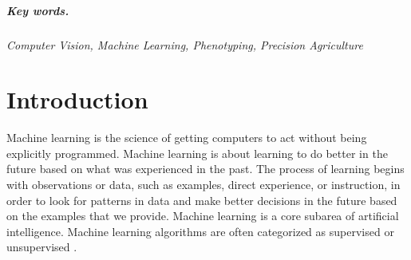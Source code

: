 \documentclass[12pt]{article}
\numberwithin{equation}{section}
\numberwithin{table}{section}
\numberwithin{figure}{section}
\begin{document}
\subparagraph{\textit{Key words.}}\textit{Computer Vision, Machine Learning, Phenotyping, Precision Agriculture}


\section{Introduction}

Machine learning is the science of getting computers to act without being explicitly programmed\cite{5392560}. Machine learning is about learning to do better in the future based on what was experienced in the past. The process of learning begins with observations or data, such as examples, direct experience, or instruction, in order to look for patterns in data and make better decisions in the future based on the examples that we provide. Machine learning is a core subarea of artificial intelligence. Machine learning algorithms are often categorized as supervised or unsupervised \cite{Ratsch2004}.
\end{document}
